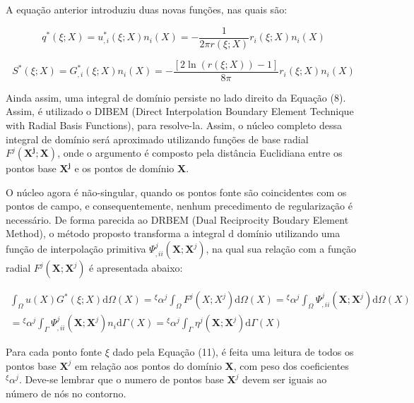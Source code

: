 \documentclass[a4paper,12p]{article}
\newcommand{\dd}[1]{\mathrm{d}#1}
\begin{document}
	A equação anterior introduziu duas novas funções, nas quais são:
	
	\begin{equation}
	q^{*}(\xi;X) = u^{*}_{,i}(\xi;X) n_{i}(X) = -\frac{1}{2\pi r(\xi;X)} r_{i}(\xi;X) n_{i}(X)
	\end{equation}
	
	\begin{equation}
	S^{*}(\xi;X) = G^{*}_{,i}(\xi;X) n_{i}(X) = -\frac{[2 \ln(r(\xi;X)) -1]}{8\pi} r_{i}(\xi;X) n_{i}(X)
	\end{equation}
	
	Ainda assim, uma integral de domínio persiste no lado direito da Equação (8). Assim, é utilizado o DIBEM (Direct Interpolation Boundary Element Technique with Radial Basis Functions), para resolve-la. Assim, o núcleo completo dessa integral de domínio será aproximado utilizando funções de base radial $F^{j}  ( \textbf{X}^{\textbf{j}}; \textbf{X}) $, onde o argumento é composto pela distância Euclidiana entre os pontos base $\textbf{X}^{\textbf{j}}$ e os pontos de domínio \textbf{X}.
	
	O núcleo agora é não-singular, quando os pontos fonte são coincidentes com os pontos de campo, e consequentemente, nenhum precedimento de regularização é necessário. De forma parecida ao DRBEM (Dual Reciprocity Boudary Element Method), o método proposto transforma a integral d domínio utilizando uma função de interpolação primitiva $\Psi^{j}_{,ii}(\textbf{X};\textbf{X}^{j})$, na qual sua relação com a função radial $F^{j}(\textbf{X};\textbf{X}^{j})$ é apresentada abaixo:
	
	\begin{equation}
	\begin{gathered}
  	\int_{\Omega}^{} u(X) G^{*}(\xi;X) \dd{\Omega(X)}
   	= 
	{}^{\xi}\alpha^{j} \int_{\Omega}^{} F^{j}(X;X^{j}) \dd{\Omega(X)}
	= 
	{}^{\xi}\alpha^{j} \int_{\Omega}^{} \Psi^{j}_{,ii}(\textbf{X};\textbf{X}^{j}) \dd{\Omega(X)}
	\\
	=
	{}^{\xi}\alpha^{j} \int_{\Gamma}^{} \Psi^{j}_{,ii}(\textbf{X};\textbf{X}^{j}) n_{i}\dd{\Gamma(X)}
	=
	{}^{\xi}\alpha^{j} \int_{\Gamma}^{} \eta^{j}(\textbf{X};\textbf{X}^{j}) \dd{\Gamma(X)}
	\end{gathered}
	\end{equation}
	
	Para cada ponto fonte $\xi$ dado pela Equação (11), é feita uma leitura de todos os pontos base $\textbf{X}^{j}$ em relação aos pontos do domínio \textbf{X}, com peso dos coeficientes ${}^{\xi}\alpha^{j}$. Deve-se lembrar que o numero de pontos base $\textbf{X}^{j}$ devem ser iguais ao número de nós no contorno.
	
\end{document}
